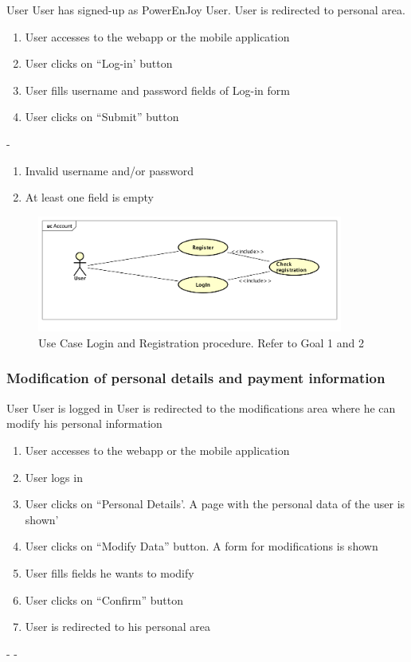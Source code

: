 {User}
{}
{User has signed-up as PowerEnJoy User.}
{User is redirected to personal area.}
{
	\begin{enumerate}
		\item User accesses to the webapp or the mobile application
		\item User clicks on ``Log-in' button
		\item User fills username and password fields of Log-in form
		\item User clicks on ``Submit'' button
	\end{enumerate}
}
{-}
{
	\begin{enumerate}
		\item Invalid username and/or password
		\item At least one field is empty
	\end{enumerate}
}

\begin{figure}[h]

	\includegraphics[width=380px]{img/usecase_login_registration}
	\caption{Use Case Login and Registration procedure. Refer to Goal 1 and 2}
\end{figure}

\newpage


\subsubsection{Modification of personal details and payment information}


{User}
{}
{User is logged in}
{User is redirected to the modifications area where he can modify his personal information}
{
\begin{enumerate}
	\item User accesses to the webapp or the mobile application
	\item User logs in
	\item User clicks on ``Personal Details'. A page with the personal data of the user is shown'
	\item User clicks on ``Modify Data'' button. A form for modifications is shown
	\item User fills fields he wants to modify
	\item User clicks on ``Confirm'' button
	\item User is redirected to his personal area
\end{enumerate}
}
{-}
{-}


